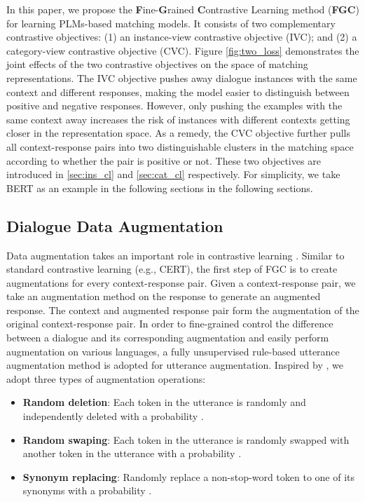 \documentclass[letterpaper]{article} \usepackage{aaai22}  \usepackage{times}  \usepackage{helvet}  \usepackage{courier}  \usepackage[hyphens]{url}  \usepackage{graphicx} \urlstyle{rm} \def\UrlFont{\rm}  \usepackage{natbib}  \usepackage{caption} \DeclareCaptionStyle{ruled}{labelfont=normalfont,labelsep=colon,strut=off} \frenchspacing  \setlength{\pdfpagewidth}{8.5in}  \setlength{\pdfpageheight}{11in}  \usepackage{algorithm}
\begin{document}
In this paper, we propose the \textbf{F}ine-\textbf{G}rained \textbf{C}ontrastive Learning method (\textbf{FGC}) for learning PLMs-based matching models. It consists of two complementary contrastive objectives: (1) an instance-view contrastive objective (IVC); and (2) a category-view contrastive objective (CVC). Figure \ref{fig:two_loss} demonstrates the joint effects of the two contrastive objectives on the space of matching representations. The IVC objective pushes away dialogue instances with the same context and different responses, making the model easier to distinguish between positive and negative responses. However, only pushing the examples with the same context away increases the risk of instances with different contexts getting closer in the representation space. As a remedy, the CVC objective further pulls all context-response pairs into two distinguishable clusters in the matching space according to whether the pair is positive or not. These two objectives are introduced in \ref{sec:ins_cl} and \ref{sec:cat_cl} respectively. For simplicity, we take BERT as an example in the following sections in the following sections. 





\subsection{Dialogue Data Augmentation}
\label{sec:augmentation}

Data augmentation takes an important role in contrastive learning \cite{zoph2020rethinking,ho2020contrastive}. 
Similar to standard contrastive learning (e.g., CERT), the first step of FGC is to create augmentations for every context-response pair. Given a context-response pair, we take an augmentation method on the response to generate an augmented response. The context and augmented response pair form the augmentation of the original context-response pair. In order to fine-grained control the difference between a dialogue and its corresponding augmentation and easily perform augmentation on various languages, a fully unsupervised rule-based utterance augmentation method is adopted for utterance augmentation. Inspired by \cite{wei-zou-2019-eda}, we adopt three types of augmentation operations:
\begin{itemize}
    \item \textbf{Random deletion}: Each token in the utterance is randomly and independently deleted with a probability . \item \textbf{Random swaping}: Each token in the utterance is randomly swapped with another token in the utterance with a probability .
    \item \textbf{Synonym replacing}: Randomly replace a non-stop-word token to one of its synonyms with a probability .\end{itemize}
\end{document}
